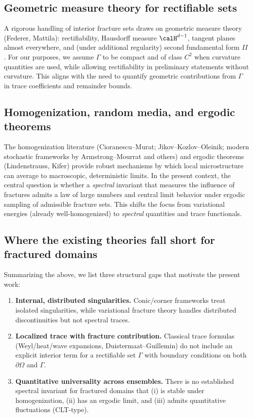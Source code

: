 \subsection*{Geometric measure theory for rectifiable sets}
A rigorous handling of interior fracture sets draws on geometric measure theory
(Federer, Mattila): rectifiability, Hausdorff measure $\calH^{d-1}$, tangent planes
almost everywhere, and (under additional regularity) second fundamental form $II$.
For our purposes, we assume $\Gamma$ to be compact and of class $C^2$ when curvature
quantities are used, while allowing rectifiability in preliminary statements without
curvature. This aligns with the need to quantify geometric contributions from
$\Gamma$ in trace coefficients and remainder bounds.

\subsection*{Homogenization, random media, and ergodic theorems}
The homogenization literature (Cioranescu--Murat; Jikov--Kozlov--Oleinik; modern
stochastic frameworks by Armstrong--Mourrat and others) and ergodic theorems
(Lindenstrauss, Kifer) provide robust mechanisms by which local microstructure can
average to macroscopic, deterministic limits. In the present context, the central
question is whether a \emph{spectral} invariant that measures the influence of
fractures admits a law of large numbers and central limit behavior under ergodic
sampling of admissible fracture sets. This shifts the focus from variational energies
(already well-homogenized) to \emph{spectral} quantities and trace functionals.

\subsection*{Where the existing theories fall short for fractured domains}
Summarizing the above, we list three structural gaps that motivate the present work:
\begin{enumerate}[label=(G\arabic*)]
  \item \textbf{Internal, distributed singularities.} Conic/corner frameworks treat
  isolated singularities, while variational fracture theory handles distributed
  discontinuities but not spectral traces.
  \item \textbf{Localized trace with fracture contribution.} Classical trace formulas
  (Weyl/heat/wave expansions, Duistermaat--Guillemin) do not include an explicit
  interior term for a rectifiable set $\Gamma$ with boundary conditions on both
  $\partial\Omega$ and $\Gamma$.
  \item \textbf{Quantitative universality across ensembles.} There is no established
  spectral invariant for fractured domains that (i) is stable under homogenization,
  (ii) has an ergodic limit, and (iii) admits quantitative fluctuations (CLT-type).
\end{enumerate}

